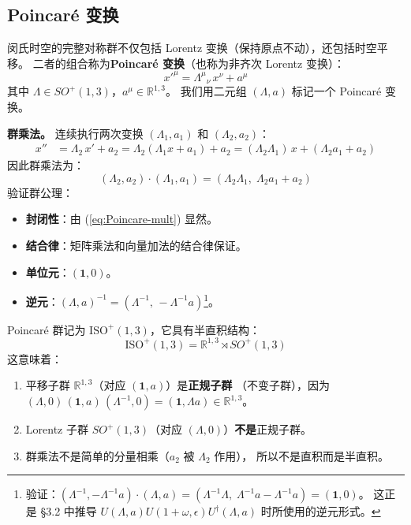 \subsection{Poincar\'e 变换}

闵氏时空的完整对称群不仅包括 Lorentz 变换（保持原点不动），还包括时空平移。
二者的组合称为\textbf{Poincar\'e 变换}（也称为非齐次 Lorentz 变换）：
\begin{equation}\label{eq:Poincare-def}
  x'^\mu = \Lambda^\mu{}_\nu\,x^\nu + a^\mu
\end{equation}
其中 $\Lambda \in SO^+(1,3)$，$a^\mu \in \mathbb{R}^{1,3}$。
我们用二元组 $(\Lambda, a)$ 标记一个 Poincar\'e 变换。


\begin{tcolorbox}[colback=white!5,colframe=black!45]
  \textbf{群乘法。}
连续执行两次变换 $(\Lambda_1, a_1)$ 和 $(\Lambda_2, a_2)$：
\begin{align}
  x'' &= \Lambda_2\,x' + a_2 = \Lambda_2(\Lambda_1 x + a_1) + a_2
       = (\Lambda_2\Lambda_1)\,x + (\Lambda_2 a_1 + a_2)
\end{align}
因此群乘法为：
\begin{equation}\label{eq:Poincare-mult}
\boxed{
  (\Lambda_2, a_2)\cdot(\Lambda_1, a_1)
  = (\Lambda_2\Lambda_1,\;\Lambda_2 a_1 + a_2)
}
\end{equation}
验证群公理：
\begin{itemize}
  \item \textbf{封闭性}：由 (\ref{eq:Poincare-mult}) 显然。
  \item \textbf{结合律}：矩阵乘法和向量加法的结合律保证。
  \item \textbf{单位元}：$(\mathbf{1}, 0)$。
  \item \textbf{逆元}：$(\Lambda, a)^{-1} = (\Lambda^{-1},\,-\Lambda^{-1}a)$\footnote{
        验证：$(\Lambda^{-1}, -\Lambda^{-1}a)\cdot(\Lambda, a)
        = (\Lambda^{-1}\Lambda,\;\Lambda^{-1}a - \Lambda^{-1}a) = (\mathbf{1}, 0)$。
        这正是 \S3.2 中推导 $U(\Lambda,a)U(1+\omega,\epsilon)U^\dagger(\Lambda,a)$
        时所使用的逆元形式。}。
\end{itemize}
\end{tcolorbox}
\vspace{2ex}
\par
Poincar\'e 群记为 $\mathrm{ISO}^+(1,3)$，它具有半直积结构：
\begin{equation}\label{eq:semidirect}
\boxed{
  \mathrm{ISO}^+(1,3) = \mathbb{R}^{1,3} \rtimes SO^+(1,3)
}
\end{equation}
这意味着：
\begin{enumerate}
  \item 平移子群 $\mathbb{R}^{1,3}$（对应 $(\mathbf{1}, a)$）是\textbf{正规子群}
        （不变子群），因为
        $(\Lambda, 0)\,(\mathbf{1}, a)\,(\Lambda^{-1}, 0) = (\mathbf{1}, \Lambda a) \in \mathbb{R}^{1,3}$。
  \item Lorentz 子群 $SO^+(1,3)$（对应 $(\Lambda, 0)$）\textbf{不是}正规子群。
  \item 群乘法不是简单的分量相乘（$a_2$ 被 $\Lambda_2$ 作用），
        所以不是直积而是半直积。
\end{enumerate}
